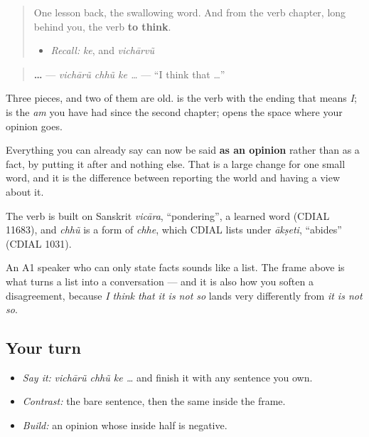 \label{lesson:GU-C33-vichaarun-ke}



\begin{quote}
One lesson back, the swallowing word. And from the verb chapter, long behind you, the verb \textbf{to think}.

\begin{itemize}
\raggedright
  \item \emph{Recall:} \emph{ke}, and \emph{vichārvũ}
\end{itemize}
\end{quote}

\begin{cousinweb}
\begin{quote}
\textbf{   …} — \emph{vichārũ chhũ ke …} — \textquotedblleft{}I think that …\textquotedblright{}
\end{quote}

Three pieces, and two of them are old. \textbf{} is the verb with the ending that means \emph{I}; \textbf{} is the \emph{am} you have had since the second chapter; \textbf{} opens the space where your opinion goes.

Everything you can already say can now be said \textbf{as an opinion} rather than as a fact, by putting it after \textbf{} and nothing else. That is a large change for one small word, and it is the difference between reporting the world and having a view about it.

The verb is built on Sanskrit \emph{vicāra}, \textquotedblleft{}pondering\textquotedblright{}, a learned word (CDIAL 11683), and \emph{chhũ} is a form of \emph{chhe}, which CDIAL lists under \emph{ākṣeti}, \textquotedblleft{}abides\textquotedblright{} (CDIAL 1031).
\end{cousinweb}

\begin{culture}
An A1 speaker who can only state facts sounds like a list. The frame above is what turns a list into a conversation — and it is also how you soften a disagreement, because \emph{I think that it is not so} lands very differently from \emph{it is not so}.
\end{culture}

\subsection*{Your turn}
\begin{itemize}
\raggedright
  \item \emph{Say it:} \emph{vichārũ chhũ ke …} and finish it with any sentence you own.
  \item \emph{Contrast:} the bare sentence, then the same inside the frame.
  \item \emph{Build:} an opinion whose inside half is negative.
\end{itemize}

